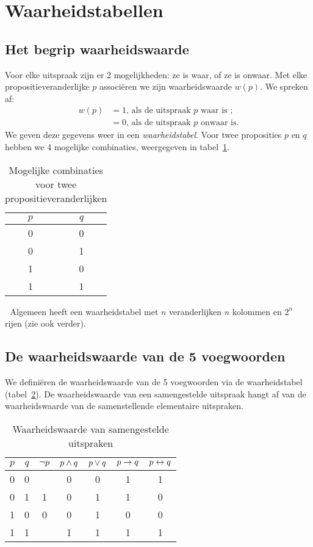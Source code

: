 \section{Waarheidstabellen}
  \subsection{Het begrip waarheidswaarde}
Voor elke uitspraak zijn er 2 mogelijkheden: ze is waar, of ze is onwaar. Met elke propositieveranderlijke $p$ associ\"{e}ren we zijn waarheidswaarde $w(p)$. We spreken af:
\begin{displaymath}
\begin{array}{rl }
    w(p)  & = 1 \mbox{, als de uitspraak } p \mbox{ waar is };  \\
      &  = 0 \mbox{, als de uitspraak } p \mbox{ onwaar is.}
\end{array}
  \end{displaymath}
We geven deze gegevens weer in een \emph{waarheidstabel}. Voor twee proposities $p$ en $q$ hebben we 4 mogelijke combinaties, weergegeven in tabel~\ref{tbl:waarheid}.
\begin{table}[htb]
  \centering
  \caption{Mogelijke combinaties voor twee propositieveranderlijken}\label{tbl:waarheid}
\begin{tabular}{cc}
\toprule
$p$  & $q$  \\ \midrule
0  & 0  \\
0  & 1 \\
1  & 0 \\
1  & 1 \\
\bottomrule
\end{tabular}
\end{table}
\noindent
Algemeen heeft een waarheidstabel met $n$ veranderlijken $n$ kolommen en $2^{n}$ rijen (zie ook verder).

\subsection{De waarheidswaarde van de 5 voegwoorden}
We defini\"{e}ren de waarheidswaarde van de 5 voegwoorden via de waarheidstabel (tabel~\ref{tbl:waarheidvoegwoorden}). De waarheidswaarde van een samengestelde uitspraak hangt af van de waarheidswaarde van de samenstellende elementaire uitspraken.

\begin{table}[htb]
  \centering
  \caption{Waarheidswaarde van samengestelde uitspraken}\label{tbl:waarheidvoegwoorden}
\begin{tabular}{ccccccc}
\toprule
 $p$  & $q$ & $\neg p$ & $p \wedge q$ & $p \vee q$ & $p \rightarrow q$ & $p \leftrightarrow q$ \\
\midrule
  0 & 0 & & 0 & 0 & 1 & 1\\
  0 & 1 & 1 & 0 & 1 & 1 & 0\\
  1 & 0 & 0 & 0 & 1 & 0 & 0\\
  1 & 1 &  & 1 & 1 & 1 & 1\\
\bottomrule
\end{tabular}
\end{table}


